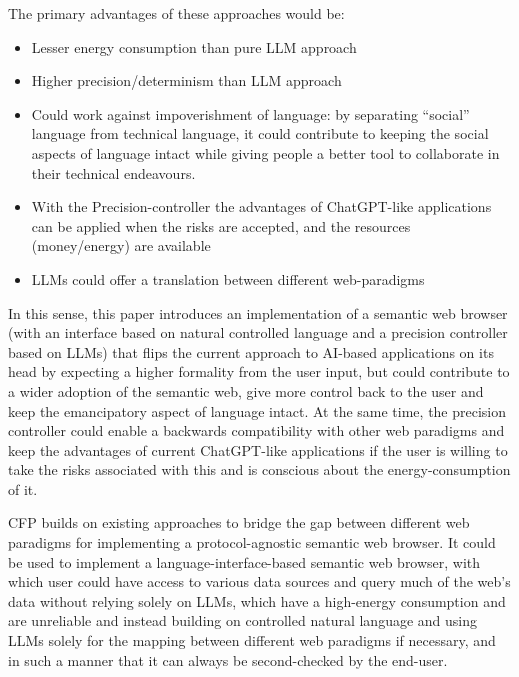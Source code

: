 \documentclass[12pt,a4paper]{article}
\begin{document}
The primary advantages of these approaches would be:
\begin{itemize}
    \item Lesser energy consumption than pure LLM approach
    \item Higher precision/determinism than LLM approach
    \item Could work against impoverishment of language: by separating ``social'' language from technical language, it could contribute to keeping the social aspects of language intact while giving people a better tool to collaborate in their technical endeavours.
    \item With the Precision-controller the advantages of ChatGPT-like applications can be applied when the risks are accepted, and the resources (money/energy) are available
    \item LLMs could offer a translation between different web-paradigms
\end{itemize}

In this sense, this paper introduces an implementation of a semantic web browser (with an interface based on natural controlled language and a precision controller based on LLMs) that flips the current approach to AI-based applications on its head by expecting a higher formality from the user input, but could contribute to a wider adoption of the semantic web, give more control back to the user and keep the emancipatory aspect of language intact. At the same time, the precision controller could enable a backwards compatibility with other web paradigms and keep the advantages of current ChatGPT-like applications if the user is willing to take the risks associated with this and is conscious about the energy-consumption of it.

CFP builds on existing approaches to bridge the gap between different web paradigms for implementing a protocol-agnostic semantic web browser. It could be used to implement a language-interface-based semantic web browser, with which user could have access to various data sources and query much of the web's data without relying solely on LLMs, which have a high-energy consumption and are unreliable and instead building on controlled natural language and using LLMs solely for the mapping between different web paradigms if necessary, and in such a manner that it can always be second-checked by the end-user.

\printbibliography
\end{document}
